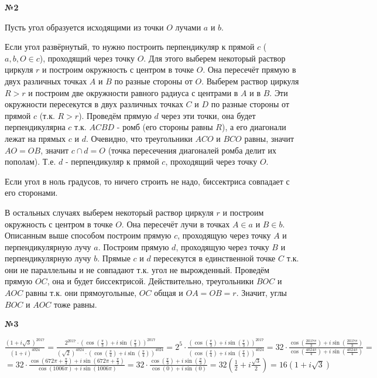 \documentclass{article}
\newenvironment{task}{\begin{center}\fontsize{14}{14}\selectfont\bf}{\rm\fontsize{12}{12}\selectfont\end{center}}
\begin{document}
	\begin{task} 
		№2
	\end{task}

	Пусть угол образуется исходящими из точки $O$ лучами $a$ и $b$.
	
	Если угол развёрнутый, то нужно построить перпендикуляр к прямой $c$ ($a, b, O \in c$), проходящий через точку $O$. Для этого выберем некоторый раствор циркуля $r$ и построим окружность с центром в точке $O$. Она пересечёт прямую в двух различных точках $A$ и $B$ по разные стороны от $O$. Выберем раствор циркуля $R > r$ и построим две окружности равного радиуса с центрами в $A$ и в $B$. Эти окружности пересекутся в двух различных точках $C$ и $D$ по разные стороны от прямой $c$ (т.к. $R > r$). Проведём прямую $d$ через эти точки, она будет перпендикулярна $c$ т.к. $ACBD$ - ромб (его стороны равны $R$), а его диагонали лежат на прямых $c$ и $d$. Очевидно, что треугольники $ACO$ и $BCO$ равны, значит $AO=OB$, значит $c\cap d = O$ (точка пересечения диагоналей ромба делит их пополам). Т.е. $d$ - перпендикуляр к прямой $c$, проходящий через точку $O$.
	
	Если угол в ноль градусов, то ничего строить не надо, биссектриса совпадает с его сторонами.
	
	В остальных случаях выберем некоторый раствор циркуля $r$ и построим окружность с центром в точке $O$. Она пересечёт лучи в точках $A\in a$ и $B\in b$. Описанным выше способом построим прямую $c$, проходящую через точку $A$ и перпендикулярную лучу $a$. Построим прямую $d$, проходящую через точку $B$ и перпендикулярную лучу $b$. Прямые $c$ и $d$ пересекутся в единственной точке $C$ т.к. они не параллельны и не совпадают т.к. угол не вырожденный. Проведём прямую $OC$, она и будет биссектрисой. Действительно, треугольники $BOC$ и $AOC$ равны т.к. они прямоугольные, $OC$ общая и $OA=OB=r$. Значит, углы $BOC$ и $AOC$ тоже равны.
	 
	
	\begin{task} 
		№3
	\end{task}
	\fontsize{14}{14}\selectfont
	\begin{center}
		$\frac{(1 + i\sqrt{3})^{2017}}{(1 + i)^{4024}} 
		= \frac{2^{2017}\cdot\left( \cos\left(\frac{\pi}{3}\right)  + i\sin\left(\frac{\pi}{3}\right)\right) ^{2017}}
		{(\sqrt{2})^{4024}\cdot\left( \cos\left(\frac{\pi}{4}\right) + i\sin\left(\frac{\pi}{4}\right)\right) ^{4024}} 
		= 2^{5}\cdot\frac{\left( \cos\left(\frac{\pi}{3}\right)  + i\sin\left(\frac{\pi}{3}\right)\right) ^{2017}}
		{\left( \cos\left(\frac{\pi}{4}\right) + i\sin\left(\frac{\pi}{4}\right)\right) ^{4024}} 
		= 32\cdot\frac{ \cos\left(\frac{2017\pi}{3}\right)  + i\sin\left(\frac{2017\pi}{3}\right)}
		{\cos\left(\frac{4024\pi}{4}\right) + i\sin\left(\frac{4024\pi}{4}\right)} =$\\$
		= 32\cdot\frac{\cos\left(672\pi + \frac{\pi}{3}\right)  + i\sin\left(672\pi + \frac{\pi}{3}\right)}
		{\cos\left(1006\pi\right) + i\sin\left(1006\pi\right)} 
		= 32\cdot\frac{\cos\left(\frac{\pi}{3}\right)  + i\sin\left(\frac{\pi}{3}\right)}
		{\cos\left(0\right) + i\sin\left(0\right)} 
		= 32\left( \frac{1}{2} + i\frac{\sqrt{3}}{2} \right) = 16(1 + i\sqrt{3})$
	\end{center}
	\fontsize{12}{12}\selectfont
	 \newpage
	
\end{document}
